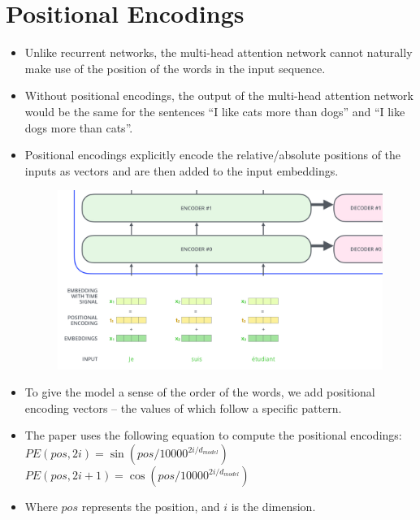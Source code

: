 \section{Positional Encodings}
\begin{itemize}
 \item  Unlike recurrent networks, the multi-head attention network cannot naturally make use of the position of the words in the input sequence.
 
 \item Without positional encodings, the output of the multi-head attention network would be the same for the sentences ``I like cats more than dogs'' and ``I like dogs more than cats''.
 
 \item Positional encodings explicitly encode the relative/absolute positions of the inputs as vectors and are then added to the input embeddings.

   \begin{figure}[h]
        	\includegraphics[scale = 0.2]{pics/transformer_positional_encoding_vectors.png}
        \end{figure}  


 \item To give the model a sense of the order of the words, we add positional encoding vectors -- the values of which follow a specific pattern. 

 \item The paper uses the following equation to compute the positional encodings: \\
 $PE(pos,2i) = \sin(pos/10000^{2i/d_{model}})$ 
  $PE(pos,2i+1) = \cos(pos/10000^{2i/d_{model}})$
 
\item Where $pos$ represents the position, and $i$ is the dimension.


\end{itemize}
